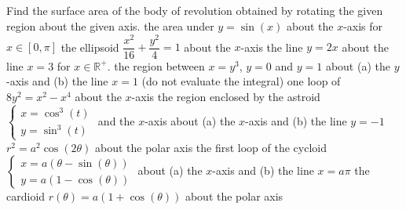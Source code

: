 
\subsection*{}
\begin{Exercise} Find the surface area of the body of revolution obtained by rotating the given region about the given axis. 
\Question[difficulty = 1] the area   under $y = \sin  (x) $ about the $x$-axis for $x \in [0,\pi]$
\Question[difficulty = 1] the ellipsoid $ \dfrac{x^2}{16} + \dfrac{y^2}{4} = 1$ about the $x$-axis	
\Question[difficulty = 2] the line $ y = 2x$ about the line $ x = 3 $ for $ x \in \mathbb{R}^+$. 
\Question[difficulty = 2] the region between $x=y^3$, $y=0$ and $y=1$ about (a) the $y$-axis and (b) the line $x=1$ (do not evaluate the integral)
\Question[difficulty = 3] one loop of $8y^2 = x^2 - x^4 $ about the $x$-axis
\Question[difficulty = 3] the region enclosed by the astroid $\left\{ \begin{array}{l} x = \cos^3(t) \\ y = \sin^3(t) \end{array}  \right.$ and the $x$-axis about (a) the $x$-axis and (b) the line $y=-1$ 
\Question[difficulty = 3] $r^2 = a^2 \cos(2\theta) $ about the polar axis
\Question[difficulty = 3] the first loop of the cycloid $\left \{\begin{array}{l}
    x = a ( \theta - \sin  (\theta) )\\
    y = a ( 1 - \cos  (\theta) )  
    \end{array}\right. $
    about (a) the $x$-axis and (b) the line $x = a \pi$
\ifanalysis
\Question[difficulty = 3] the cardioid $r(\theta) = a (1 + \cos  (\theta))$ about the polar axis 
\fi
\end{Exercise}

